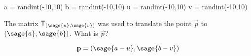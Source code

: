 \documentclass{ximera}
\author{Jenny Sheldon \and Bart Snapp}
\begin{document}
\makerandom
 
\begin{sagesilent}
  a = randint(-10,10)
  b = randint(-10,10)
  u = randint(-10,10)
  v = randint(-10,10)
\end{sagesilent}

\begin{exercise}
  The matrix $\mat{T}_{(\sage{u},\sage{v})}$ was used to translate the point
  $\vec{p}$ to $(\sage{a},\sage{b})$.  What is $\vec{p}$?
  \begin{prompt}
    \[
    \vec{p} = (\sage{a-u},\sage{b-v})
    \]
  \end{prompt}
\end{exercise}
\end{document}
